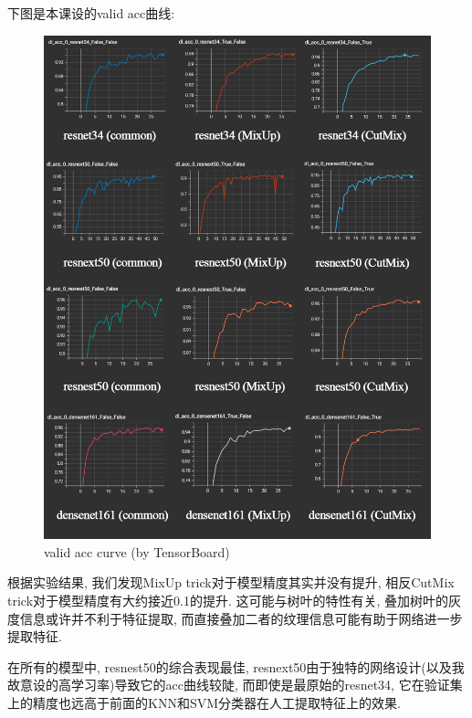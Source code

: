 \documentclass[lang=cn,12pt,a4paper,cite=authoryear]{elegantpaper}
\begin{document}
下图是本课设的valid acc曲线:

\begin{figure}[p]
    \centering
    \includegraphics[width=\textwidth]{lateximgs/5.png}
    \caption{valid acc curve (by TensorBoard)}
\end{figure}

\newpage
根据实验结果, 我们发现MixUp trick对于模型精度其实并没有提升, 相反CutMix trick对于模型精度有大约接近0.1的提升. 这可能与树叶的特性有关, 叠加树叶的灰度信息或许并不利于特征提取, 而直接叠加二者的纹理信息可能有助于网络进一步提取特征.

在所有的模型中, resnest50的综合表现最佳, resnext50由于独特的网络设计(以及我故意设的高学习率)导致它的acc曲线较陡, 而即使是最原始的resnet34, 它在验证集上的精度也远高于前面的KNN和SVM分类器在人工提取特征上的效果. 
\end{document}

